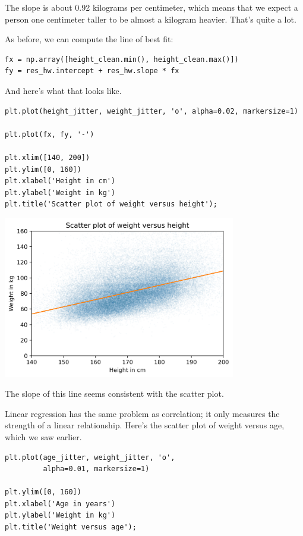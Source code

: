 The slope is about 0.92 kilograms per centimeter, which means that we
expect a person one centimeter taller to be almost a kilogram heavier.
That's quite a lot.

As before, we can compute the line of best fit:

\begin{lstlisting}[]
fx = np.array([height_clean.min(), height_clean.max()])
fy = res_hw.intercept + res_hw.slope * fx
\end{lstlisting}

And here's what that looks like.

\begin{lstlisting}[]
plt.plot(height_jitter, weight_jitter, 'o', alpha=0.02, markersize=1)

plt.plot(fx, fy, '-')

plt.xlim([140, 200])
plt.ylim([0, 160])
plt.xlabel('Height in cm')
plt.ylabel('Weight in kg')
plt.title('Scatter plot of weight versus height');
\end{lstlisting}

\begin{center}
\includegraphics[width=4in]{chapters/09_relationships_files/09_relationships_101_0.png}
\end{center}

The slope of this line seems consistent with the scatter plot.

Linear regression has the same problem as correlation; it only measures
the strength of a linear relationship. Here's the scatter plot of weight
versus age, which we saw earlier.

\begin{lstlisting}[]
plt.plot(age_jitter, weight_jitter, 'o', 
         alpha=0.01, markersize=1)

plt.ylim([0, 160])
plt.xlabel('Age in years')
plt.ylabel('Weight in kg')
plt.title('Weight versus age');
\end{lstlisting}

